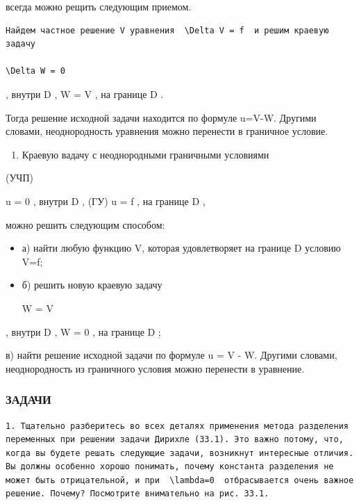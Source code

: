 \documentclass[
  ukrainian,
]{article}
\providecommand{\tightlist}{%
  \setlength{\itemsep}{0pt}\setlength{\parskip}{0pt}}
\begin{document}
всегда можно рещить следующим приемом.

\begin{verbatim}
Найдем частное решение V уравнения  \Delta V = f  и решим краевую задачу

\Delta W = 0
\end{verbatim}

, внутри D , W = V , на границе D .

Тогда решение исходной задачи находится по формуле u=V-W. Другими
словами, неоднородность уравнения можно перенести в граничное условие.

\begin{enumerate}
\def\labelenumi{\arabic{enumi}.}
\setcounter{enumi}{1}
\tightlist
\item
  Краевую вадачу с неоднородными граничными условиями
\end{enumerate}

(УЧП)

\Delta u = 0 , внутри D , (ГУ) u = f , на границе D ,

можно решить следующим способом:

\begin{itemize}
\item
  а) найти любую функцию V, которая удовлетворяет на границе D условию
  V=f;
\item
  б) решить новую краевую задачу

  \Delta W = \Delta V
\end{itemize}

, внутри D , W = 0 , на границе D ;

в) найти решение исходной задачи по формуле u = V - W. Другими словами,
неоднородность из граничного условия можно перенести в уравнение.

\subsubsection{ЗАДАЧИ}\label{ux437ux430ux434ux430ux447ux438-12}

\begin{verbatim}
1. Тщательно разберитесь во всех деталях применения метода разделения переменных при решении задачи Дирихле (33.1). Это важно потому, что, когда вы будете решать следующие задачи, возникнут интересные отличия. Вы должны особенно хорошо понимать, почему константа разделения не может быть отрицательной, и при  \lambda=0  отбрасывается очень важное решение. Почему? Посмотрите внимательно на рис. 33.1.
\end{verbatim}
\end{document}

